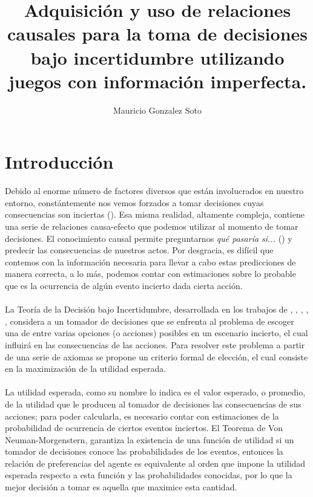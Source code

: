 \documentclass[11pt]{article}
\title{Adquisición y uso de relaciones causales para la toma de decisiones bajo incertidumbre utilizando juegos con información imperfecta.}
\author{Mauricio Gonzalez Soto}
\theoremstyle{plain}
\begin{document}
\maketitle
\section{Introducción}
Debido al enorme número de factores diversos que están involucrados en nuestro entorno, constántemente nos vemos forzados a tomar decisiones cuyas consecuencias son inciertas (\cite{danks2014unifying}). Esa misma realidad, altamente compleja, contiene una serie de relaciones causa-efecto que podemos utilizar al momento de tomar decisiones. El conocimiento causal permite preguntarnos  \textit{qué pasaría si...} (\cite{stalnaker2016knowledge}) y predecir las consecuencias de nuestros actos. Por desgracia, es difícil que contemos con la información necesaria para llevar a cabo estas predicciones de manera correcta, a lo más, podemos contar con estimaciones sobre lo probable que es la ocurrencia de algún evento incierto dada cierta acción.\\
\\
\indent La Teoría de la Decisión bajo Incertidumbre, desarrollada en los trabajos de \cite{von1944theory}, \cite{definetti1930}, \cite{definetti1937}, \cite{savage1954the}, \cite{bernardo2000bayesian}, considera a un tomador de decisiones que se enfrenta al problema de escoger una de entre varias opciones (o acciones) posibles en un escenario incierto, el cual influirá en las consecuencias de las acciones. Para resolver este problema a partir de una serie de axiomas se propone un criterio formal de elección, el cual consiste en la maximización de la utilidad esperada.\\
\\
\indent La utilidad esperada, como su nombre lo indica es el valor esperado, o promedio, de la utilidad que le producen al tomador de decisiones las consecuencias de sus acciones; para poder calcularla, es necesario contar con estimaciones de la probabilidad de ocurrencia de ciertos eventos inciertos. El Teorema de Von Neuman-Morgenstern, garantiza la existencia de una función de utilidad si un tomador de decisiones conoce las probabilidades de los eventos, entonces  la relación de preferencias del agente es equivalente al orden que impone la utilidad esperada respecto a esta función y las probabilidades conocidas, por lo que la mejor decisión a tomar es aquella que maximice esta cantidad.\\
\end{document}
